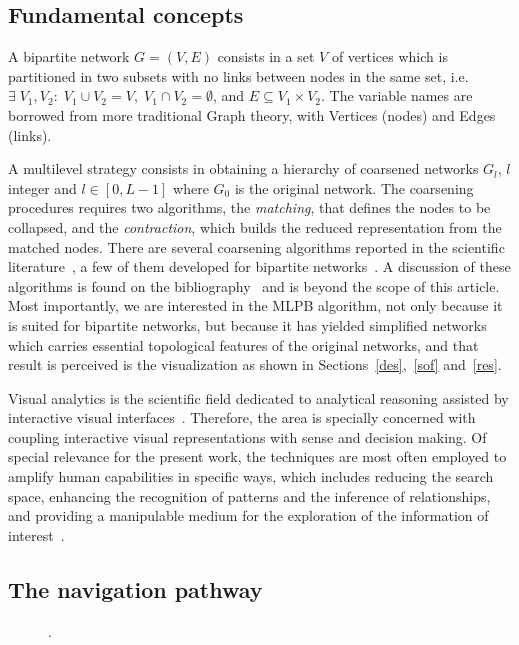 \documentclass[runningheads]{llncs}
\begin{document}
\subsection{Fundamental concepts}\label{bac}
A bipartite network $G=(V,E)$ consists in a set $V$ of vertices which is partitioned in two subsets
with no links between nodes in the same set, i.e. $\exists\; V_1, V_2:\; V_1\cup V_2 = V,\;V_1\cap V_2 = \emptyset$, and $E\subseteq V_1 \times V_2$.
The variable names are borrowed from more traditional Graph theory, with Vertices (nodes) and Edges (links).

A multilevel strategy consists in obtaining a hierarchy of coarsened networks $G_l$, $l$ integer and $l \in [0,L-1]$ where $G_0$ is the original network.
The coarsening procedures requires two algorithms, the \emph{matching}, that defines the nodes to be collapsed, and the \emph{contraction}, which builds the reduced representation
from the matched nodes.
There are several coarsening algorithms reported in the scientific literature~\cite{}, a few of them
developed for bipartite networks~\cite{}.
A discussion of these algorithms is found on the bibliography~\cite{} and is beyond the scope of this article.
Most importantly, we are interested in the MLPB algorithm, not only because it is suited for bipartite networks, but because it has yielded simplified networks which carries essential topological features of the original networks, and that result is perceived is the visualization as shown in Sections~\ref{des},~\ref{sof} and~\ref{res}.

Visual analytics is the scientific field dedicated to analytical reasoning assisted by interactive visual interfaces~\cite{}.
Therefore, the area is specially concerned with coupling interactive visual representations with sense and decision making.
Of special relevance for the present work, the techniques are most often employed to amplify human capabilities in specific ways, which includes reducing the search space, enhancing the recognition of patterns and the inference of relationships, and providing a manipulable medium for the exploration of the information of interest~\cite{}.

\subsection{The navigation pathway}



\begin{figure}[!h]\centering
  \caption{.
  }\label{fig:glob}
\end{figure}
\end{document}
